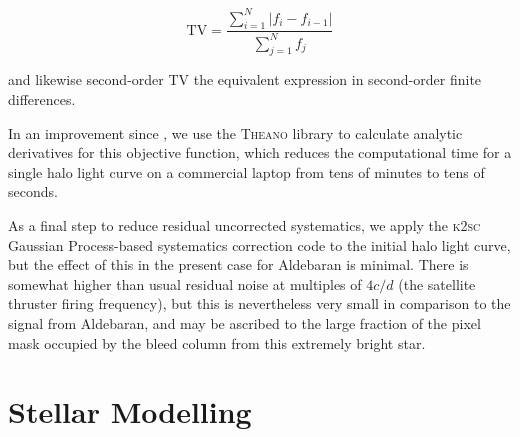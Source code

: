 \documentclass[modern]{aastex61}
\begin{document}
\begin{equation}
\text{TV} = \dfrac{\sum_{i=1}^{N} |{f}_i - {f}_{i-1}|}{\sum_{j=1}^{N} {f}_j}
\end{equation}

\noindent and likewise second-order TV the equivalent expression in second-order finite differences. 

In an improvement since \citet{White2017}, we use the \textsc{Theano} library \citep{theano} to calculate analytic derivatives for this objective function, which reduces the computational time for a single halo light curve on a commercial laptop from tens of minutes to tens of seconds. 

As a final step to reduce residual uncorrected systematics, we apply the \textsc{k2sc} \citep{k2sc} Gaussian Process-based systematics correction code to the initial halo light curve, but the effect of this in the present case for Aldebaran is minimal.
There is somewhat higher than usual residual noise at multiples of $4 c/d$ (the satellite thruster firing frequency), but this is nevertheless very small in comparison to the signal from Aldebaran, and may be ascribed to the large fraction of the pixel mask occupied by the bleed column from this extremely bright star.


\section{Stellar Modelling}\label{sec:mod}
\end{document}
